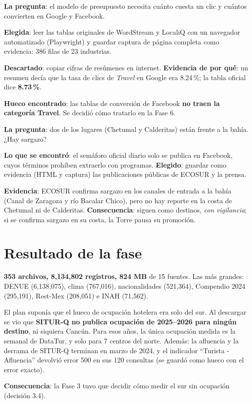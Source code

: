 \begin{opciones}
\textbf{La pregunta}: el modelo de presupuesto necesita cuánto cuesta un clic y cuántos convierten en Google y Facebook.

\textbf{Elegida}: leer las tablas originales de WordStream y LocaliQ con un navegador automatizado (Playwright) y guardar
captura de página completa como evidencia: 386 filas de 23 industrias.

\textbf{Descartado}: copiar cifras de resúmenes en internet. \textbf{Evidencia de por qué}: un resumen decía que la tasa de
clics de \emph{Travel} en Google era 8.24\,\%; la tabla oficial dice \textbf{8.73\,\%}.

\textbf{Hueco encontrado}: las tablas de conversión de Facebook \textbf{no traen la categoría Travel}. Se decidió cómo
tratarlo en la Fase 6.
\end{opciones}

\begin{opciones}
\textbf{La pregunta}: dos de los lugares (Chetumal y Calderitas) están frente a la bahía. ¿Hay sargazo?

\textbf{Lo que se encontró}: el semáforo oficial diario solo se publica en Facebook, cuyos términos prohíben extraerlo con
programas. \textbf{Elegido}: guardar como evidencia (HTML y captura) las publicaciones públicas de ECOSUR y la prensa.

\textbf{Evidencia}: ECOSUR confirma sargazo en los canales de entrada a la bahía (Canal de Zaragoza y río Bacalar Chico),
pero no hay reporte en la costa de Chetumal ni de Calderitas. \textbf{Consecuencia}: siguen como destinos, \emph{con
vigilancia}; si se confirma sargazo en su costa, la Torre pausa su promoción.
\end{opciones}

\section*{Resultado de la fase}
\textbf{353 archivos, 8,134,802 registros, 824 MB} de 15 fuentes. Las más grandes: DENUE (6,138,075), clima (767,016),
nacionalidades (521,364), Compendio 2024 (295,191), Rest-Mex (208,051) e INAH (71,562).

\begin{opciones}
El plan suponía que el hueco de ocupación hotelera era solo del sur. Al descargar se vio que \textbf{SITUR-Q no publica
ocupación de 2025–2026 para ningún destino}, ni siquiera Cancún. Para esos años, la única ocupación medida es la semanal de
DataTur, y solo para 7 centros del norte. Además: la afluencia y la derrama de SITUR-Q terminan en marzo de 2024, y el
indicador ``Turista - Afluencia'' devolvió error 500 en sus 120 consultas (se guardó como hueco con el error exacto).

\textbf{Consecuencia}: la Fase 3 tuvo que decidir cómo medir el sur sin ocupación (decisión 3.4).
\end{opciones}

